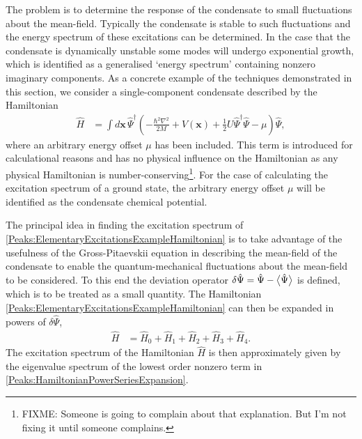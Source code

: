 The problem is to determine the response of the condensate to small fluctuations about the mean-field. Typically the condensate is stable to such fluctuations and the energy spectrum of these excitations can be determined. In the case that the condensate is dynamically unstable some modes will undergo exponential growth, which is identified as a generalised `energy spectrum' containing nonzero imaginary components. As a concrete example of the techniques demonstrated in this section, we consider a single-component condensate described by the Hamiltonian
\begin{align}
    \label{Peaks:ElementaryExcitationsExampleHamiltonian}
    \hat{H} &= \int d \bm{x}\, \hat{\Psi}^\dagger \left( -\frac{\hbar^2 \nabla^2}{2 M} + V(\bm{x}) + \frac{1}{2} U \hat{\Psi}^\dagger \hat{\Psi} - \mu \right) \hat{\Psi},
\end{align}
where an arbitrary energy offset $\mu$ has been included. This term is introduced for calculational reasons and has no physical influence on the Hamiltonian as any physical Hamiltonian is number-conserving\footnote{FIXME: Someone is going to complain about that explanation. But I'm not fixing it until someone complains.}. For the case of calculating the excitation spectrum of a ground state, the arbitrary energy offset $\mu$ will be identified as the condensate chemical potential.

The principal idea in finding the excitation spectrum of \eqref{Peaks:ElementaryExcitationsExampleHamiltonian} is to take advantage of the usefulness of the Gross-Pitaevskii equation in describing the mean-field of the condensate to enable the quantum-mechanical fluctuations about the mean-field to be considered. To this end the deviation operator $\delta \hat{\Psi} = \hat{\Psi} - {\big<\hat{\Psi}\big>}$ is defined, which is to be treated as a small quantity. The Hamiltonian \eqref{Peaks:ElementaryExcitationsExampleHamiltonian} can then be expanded in powers of $\delta \hat{\Psi}$,
\begin{align}
    \label{Peaks:HamiltonianPowerSeriesExpansion}
    \hat{H} &= \hat{H}_0 + \hat{H}_1 + \hat{H}_2 + \hat{H}_3 + \hat{H}_4.
\end{align}
The excitation spectrum of the Hamiltonian $\hat{H}$ is then approximately given by the eigenvalue spectrum of the lowest order nonzero term in \eqref{Peaks:HamiltonianPowerSeriesExpansion}.

